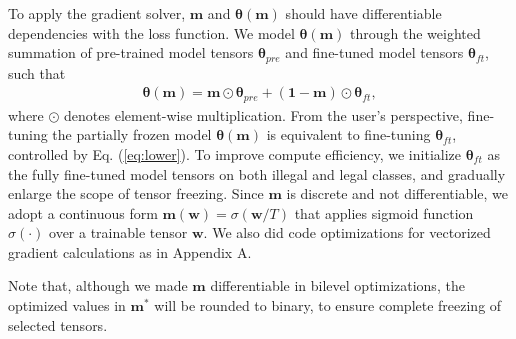 \documentclass{article}
\begin{document}
To apply the gradient solver, $\mathbf{m}$ and $\boldsymbol{\theta}(\mathbf{m})$ should have differentiable dependencies with the loss function. We model $\boldsymbol{\theta}(\mathbf{m})$ through the weighted summation of pre-trained model tensors $\boldsymbol{\theta}_{pre}$ and fine-tuned model tensors $\boldsymbol{\theta}_{ft}$, such that
\begin{align}\label{eq:frozen_weights}
\boldsymbol{\theta}(\mathbf{m}) = \mathbf{m} \odot \boldsymbol{\theta}_{pre} + (\mathbf{1} - \mathbf{m}) \odot \boldsymbol{\theta}_{ft},
\end{align}
where $\odot$ denotes element-wise multiplication. From the user's perspective, fine-tuning the partially frozen model $\boldsymbol{\theta}(\mathbf{m})$ is equivalent to fine-tuning $\boldsymbol{\theta}_{ft}$, controlled by Eq. (\ref{eq:lower}). To improve compute efficiency, we initialize $\boldsymbol{\theta}_{ft}$ as the fully fine-tuned model tensors on both illegal and legal classes, and gradually enlarge the scope of tensor freezing. Since $\mathbf{m}$ is discrete and not differentiable, we adopt a continuous form $\mathbf{m}(\mathbf{w}) = \sigma(\mathbf{w} / T)$ that applies sigmoid function $\sigma(\cdot)$ over a trainable tensor $\mathbf{w}$. We also did code optimizations for vectorized gradient calculations as in Appendix A.

Note that, although we made $\mathbf{m}$ differentiable in bilevel optimizations, the optimized values in $\mathbf{m}^*$ will be rounded to binary, to ensure complete freezing of selected tensors.




\end{document}
